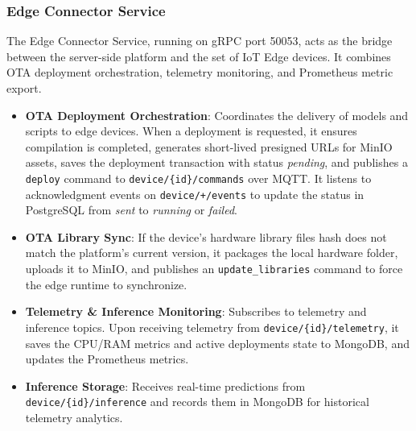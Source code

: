 
\subsubsection{Edge Connector Service}\label{sec:impl:edge_connector_svc}

The Edge Connector Service, running on \gls{gRPC} port 50053, acts as the bridge between the server-side platform and the set of \gls{IoT} Edge devices. It combines \gls{OTA} deployment orchestration, telemetry monitoring, and Prometheus metric export.

\begin{itemize}
    \item \textbf{\gls{OTA} Deployment Orchestration}: Coordinates the delivery of models and scripts to edge devices. When a deployment is requested, it ensures compilation is completed, generates short-lived presigned \glspl{URL} for MinIO assets, saves the deployment transaction with status \textit{pending}, and publishes a \texttt{deploy} command to \texttt{device/\{id\}/commands} over \gls{MQTT}. It listens to acknowledgment events on \texttt{device/+/events} to update the status in PostgreSQL from \textit{sent} to \textit{running} or \textit{failed}.
    
    \item \textbf{\gls{OTA} Library Sync}: If the device's hardware library files hash does not match the platform's current version, it packages the local hardware folder, uploads it to MinIO, and publishes an \texttt{update\_libraries} command to force the edge runtime to synchronize.
    
    \item \textbf{Telemetry \& Inference Monitoring}: Subscribes to telemetry and inference topics. Upon receiving telemetry from \texttt{device/\{id\}/telemetry}, it saves the \gls{CPU}/\gls{RAM} metrics and active deployments state to MongoDB, and updates the Prometheus metrics. 
    
    \item \textbf{Inference Storage}: Receives real-time predictions from \texttt{device/\{id\}/inference} and records them in MongoDB for historical telemetry analytics.
\end{itemize}

